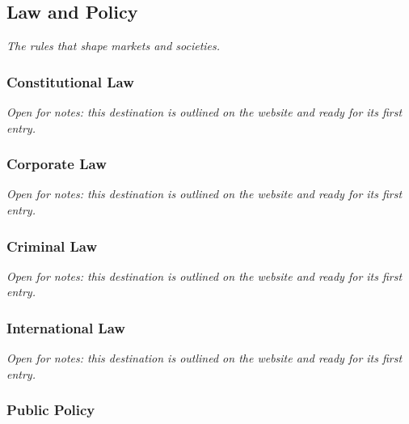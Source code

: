 \documentclass{article}
\begin{document}
\subsection{Law and Policy}\label{sec:law-and-policy}
\textit{The rules that shape markets and societies.}

\subsubsection{Constitutional Law}\label{sec:constitutional-law}
\textit{Open for notes: this destination is outlined on the website and ready for its first entry.}

\subsubsection{Corporate Law}\label{sec:corporate-law}
\textit{Open for notes: this destination is outlined on the website and ready for its first entry.}

\subsubsection{Criminal Law}\label{sec:criminal-law}
\textit{Open for notes: this destination is outlined on the website and ready for its first entry.}

\subsubsection{International Law}\label{sec:international-law}
\textit{Open for notes: this destination is outlined on the website and ready for its first entry.}

\subsubsection{Public Policy}\label{sec:public-policy}
\end{document}
